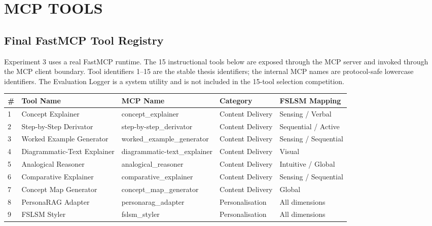 \chapter{\uppercase{MCP Tools}}

\section{Final FastMCP Tool Registry}

\noindent Experiment 3 uses a real FastMCP runtime. The 15 instructional tools below are exposed through the MCP server and invoked through the MCP client boundary. Tool identifiers 1--15 are the stable thesis identifiers; the internal MCP names are protocol-safe lowercase identifiers. The Evaluation Logger is a system utility and is not included in the 15-tool selection competition.
\begin{table}[h]
    \centering
    \begin{tabular}{|p{0.5cm}|p{4.5cm}|p{3cm}|p{3.6cm}|p{3.2cm}|}
        \hline
        \textbf{\#} &
        \textbf{Tool Name} &
        \textbf{MCP Name} &
        \textbf{Category} &
        \textbf{FSLSM Mapping} \\
        \hline
        1 & Concept Explainer & concept\_explainer & Content Delivery & Sensing / Verbal \\
        \hline
        2 & Step-by-Step Derivator & step-by-step\_derivator & Content Delivery & Sequential / Active \\
        \hline
        3 & Worked Example Generator & worked\_example\_generator & Content Delivery & Sensing / Sequential \\
        \hline
        4 & Diagrammatic-Text Explainer & diagrammatic-text\_explainer & Content Delivery & Visual \\
        \hline
        5 & Analogical Reasoner & analogical\_reasoner & Content Delivery & Intuitive / Global \\
        \hline
        6 & Comparative Explainer & comparative\_explainer & Content Delivery & Sensing / Sequential \\
        \hline
        7 & Concept Map Generator & concept\_map\_generator & Content Delivery & Global \\
        \hline
        8 & PersonaRAG Adapter & personarag\_adapter & Personalisation & All dimensions \\
        \hline
        9 & FSLSM Styler & fslsm\_styler & Personalisation & All dimensions \\

\end{tabular}
\end{table}
